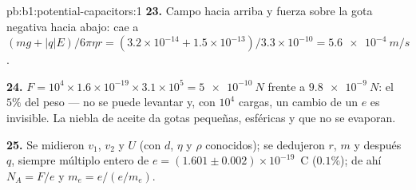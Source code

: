 \begin{solution}{pb:b1:potential-capacitors:1}
\textbf{23.} Campo hacia arriba y fuerza sobre la gota negativa hacia abajo: cae a $(mg
+ |q|E)/6\pi\eta r = (3.2 \times 10^{-14} + 1.5 \times 10^{-13})/3.3 \times 10^{-10} =
\qty{5.6e-4}{m/s}$.

\textbf{24.} $F = 10^4 \times 1.6 \times 10^{-19} \times 3.1 \times 10^5 = \qty{5e-10}{N}$
frente a $\qty{9.8e-9}{N}$: el $5\%$ del peso --- no se puede levantar y, con
$10^4$ cargas, un cambio de un $e$ es invisible. La niebla de aceite da gotas
pequeñas, esféricas y que no se evaporan.

\textbf{25.} Se midieron $v_1$, $v_2$ y $U$ (con $d$, $\eta$ y $\rho$ conocidos);
se dedujeron $r$, $m$ y después $q$, siempre múltiplo entero de
$e = (1.601 \pm 0.002) \times 10^{-19}$~C ($0.1\%$); de ahí $N_A = F/e$ y
$m_e = e/(e/m_e)$.
\end{solution}
